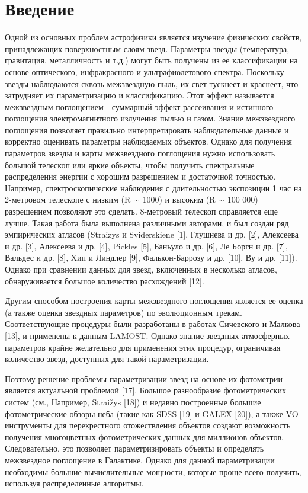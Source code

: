 \documentclass[12pt, a4paper]{article}
\begin{document}
	\section{Введение}
	Одной из основных проблем астрофизики является изучение физических свойств, принадлежащих поверхностным слоям звезд. Параметры звезды (температура, гравитация, металличность и т.д.) могут быть получены из ее классификации на основе оптического, инфракрасного и ультрафиолетового спектра. Поскольку звезды наблюдаются сквозь межзвездную пыль, их свет тускнеет и краснеет, что затрудняет их параметризацию и классификацию. Этот эффект называется межзвездным поглощением - суммарный эффект рассеивания и истинного поглощения электромагнитного излучения пылью и газом. Знание межзвездного поглощения позволяет правильно интерпретировать наблюдательные данные и корректно оценивать параметры наблюдаемых объектов. Однако для получения параметров звезды и карты межзвездного поглощения нужно использовать большой телескоп или яркие объекты, чтобы получить спектральные распределения энергии с хорошим разрешением и достаточной точностью. Например, спектроскопические наблюдения с длительностью экспозиции 1 час на 2-метровом телескопе с низким (R $\sim$ 1000) и высоким (R $\sim$ 100 000) разрешением позволяют это сделать. 8-метровый телескоп справляется еще лучше. Такая работа была выполнена различными авторами, и был создан ряд эмпирических атласов (Straizys и Sviderskiene [1], Глушнева и др. [2], Алексеева и др. [3], Алексеева и др. [4], Pickles [5], Баньуло и др. [6], Ле Боргн и др. [7], Вальдес и др. [8], Хип и Линдлер [9], Фалькон-Баррозу и др. [10], Ву и др. [11]). Однако при сравнении данных для звезд, включенных в несколько атласов, обнаруживается большое количество расхождений [12].

	Другим способом построения карты межзвездного поглощения является ее оценка (а также оценка звездных параметров) по эволюционным трекам. Соответствующие процедуры были разработаны в работах Сичевского и Малкова [13], и применены к данным LAMOST. Однако знание звездных атмосферных параметров крайне желательно для применения этих процедур, ограничивая количество звезд, доступных для такой параметризации.

	Поэтому решение проблемы параметризации звезд на основе их фотометрии является актуальной проблемой [17]. Большое разнообразие фотометрических систем (см., Например, Straižys [18]) и недавно построенные большие фотометрические обзоры неба (такие как SDSS [19] и GALEX [20]), а также VO-инструменты для перекрестного отожествления объектов  создают возможность получения многоцветных фотометрических данных для миллионов объектов. Следовательно, это позволяет параметризировать объекты и определять межзвездное поглощение в Галактике. Однако для данной параметризации необходимы большие вычислительные мощности, которые проще всего получить, используя распределенные алгоритмы.
\end{document}
